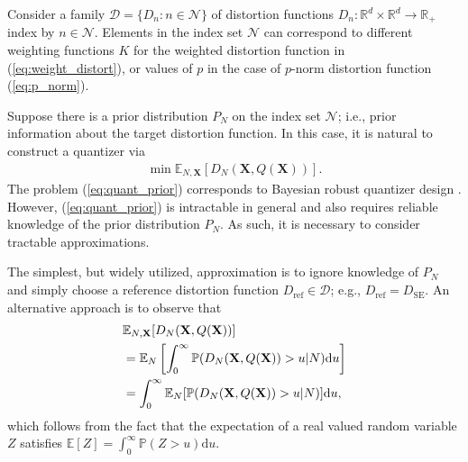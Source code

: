 \documentclass[conference]{IEEEtran}
\begin{document}
Consider a family $\mathcal{D} = \{D_n: n \in \mathcal{N}\}$ of distortion functions $D_n: \mathbb{R}^d \times \mathbb{R}^d \rightarrow \mathbb{R}_+$ index by $n \in \mathcal{N}$. Elements in the index set $\mathcal{N}$ can correspond to different weighting functions $K$ for the weighted distortion function in (\ref{eq:weight_distort}), or values of $p$ in the case of $p$-norm distortion function (\ref{eq:p_norm}). 

Suppose there is a prior distribution $P_N$ on the index set $\mathcal{N}$; i.e., prior information about the target distortion function. In this case, it is natural to construct a quantizer via
\begin{align}\label{eq:quant_prior}
	\min \mathbb{E}_{N,\mathbf{X}}[D_N(\mathbf{X},Q(\mathbf{X}))].
\end{align}
The problem (\ref{eq:quant_prior}) corresponds to Bayesian robust quantizer design \cite{Vempaty2014quantizer}. However, (\ref{eq:quant_prior}) is intractable in general and also requires reliable knowledge of the prior distribution $P_N$. As such, it is necessary to consider tractable approximations. 

The simplest, but widely utilized, approximation is to ignore knowledge of $P_N$ and simply choose a reference distortion function $D_{\mathrm{ref}} \in \mathcal{D}$; e.g., $D_{\mathrm{ref}} = D_{\mathrm{SE}}$. An alternative approach is to observe that 
\begin{align}
	&\mathbb{E}_{N,\mathbf{X}}[D_N(\mathbf{X},Q(\mathbf{X}))]\notag\\
	&= \mathbb{E}_N\left[\int_0^{\infty} \mathbb{P}(D_N(\mathbf{X},Q(\mathbf{X})) > u|N)\mathrm{d}u\right]\notag\\
	&= \int_0^{\infty} \mathbb{E}_N[\mathbb{P}(D_N(\mathbf{X},Q(\mathbf{X})) > u|N)]\mathrm{d}u,
\end{align}
which follows from the fact that the expectation of a real valued random variable $Z$ satisfies $\mathbb{E}[Z] = \int_0^{\infty} \mathbb{P}(Z > u)\mathrm{d}u$. 
\end{document}
